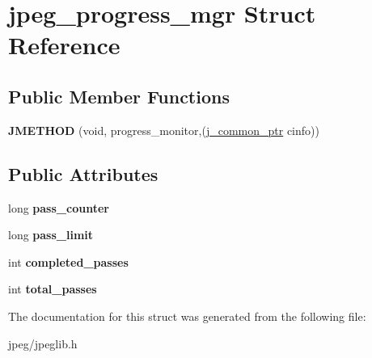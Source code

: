 \hypertarget{structjpeg__progress__mgr}{}\section{jpeg\+\_\+progress\+\_\+mgr Struct Reference}
\label{structjpeg__progress__mgr}
\subsection*{Public Member Functions}
\begin{DoxyCompactItemize}
\item 
{\bfseries J\+M\+E\+T\+H\+OD} (void, progress\+\_\+monitor,(\hyperlink{structjpeg__common__struct}{j\+\_\+common\+\_\+ptr} cinfo))\hypertarget{structjpeg__progress__mgr_aa6fbc36158dd82f586d752f976ad7fa3}{}\label{structjpeg__progress__mgr_aa6fbc36158dd82f586d752f976ad7fa3}

\end{DoxyCompactItemize}
\subsection*{Public Attributes}
\begin{DoxyCompactItemize}
\item 
long {\bfseries pass\+\_\+counter}\hypertarget{structjpeg__progress__mgr_ae52d1c89154d3f15ea44f96ee1c4ea7f}{}\label{structjpeg__progress__mgr_ae52d1c89154d3f15ea44f96ee1c4ea7f}

\item 
long {\bfseries pass\+\_\+limit}\hypertarget{structjpeg__progress__mgr_a68ec6ba74838f7b2b8ded8d4c8254c1d}{}\label{structjpeg__progress__mgr_a68ec6ba74838f7b2b8ded8d4c8254c1d}

\item 
int {\bfseries completed\+\_\+passes}\hypertarget{structjpeg__progress__mgr_a0cf4c1c84b2662763053e0eeaca417f3}{}\label{structjpeg__progress__mgr_a0cf4c1c84b2662763053e0eeaca417f3}

\item 
int {\bfseries total\+\_\+passes}\hypertarget{structjpeg__progress__mgr_a35d61747861f284526a9b312b3dc59ca}{}\label{structjpeg__progress__mgr_a35d61747861f284526a9b312b3dc59ca}

\end{DoxyCompactItemize}


The documentation for this struct was generated from the following file\+:\begin{DoxyCompactItemize}
\item 
jpeg/jpeglib.\+h\end{DoxyCompactItemize}
